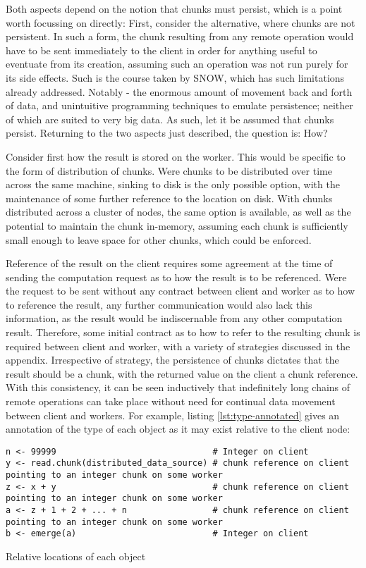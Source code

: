 Both aspects depend on the notion that chunks must persist, which is a
point worth focussing on directly: First, consider the alternative,
where chunks are not persistent. In such a form, the chunk resulting
from any remote operation would have to be sent immediately to the
client in order for anything useful to eventuate from its creation,
assuming such an operation was not run purely for its side effects. Such
is the course taken by SNOW, which has such limitations already
addressed. Notably - the enormous amount of movement back and forth of
data, and unintuitive programming techniques to emulate persistence;
neither of which are suited to very big data. As such, let it be assumed
that chunks persist. Returning to the two aspects just described, the
question is: How?

Consider first how the result is stored on the worker. This would be
specific to the form of distribution of chunks. Were chunks to be
distributed over time across the same machine, sinking to disk is the
only possible option, with the maintenance of some further reference to
the location on disk. With chunks distributed across a cluster of nodes,
the same option is available, as well as the potential to maintain the
chunk in-memory, assuming each chunk is sufficiently small enough to
leave space for other chunks, which could be enforced.

Reference of the result on the client requires some agreement at the
time of sending the computation request as to how the result is to be
referenced. Were the request to be sent without any contract between
client and worker as to how to reference the result, any further
communication would also lack this information, as the result would be
indiscernable from any other computation result. Therefore, some initial
contract as to how to refer to the resulting chunk is required between
client and worker, with a variety of strategies discussed in the
appendix. Irrespective of strategy, the persistence of chunks dictates
that the result should be a chunk, with the returned value on the client
a chunk reference. With this consistency, it can be seen inductively
that indefinitely long chains of remote operations can take place
without need for continual data movement between client and workers. For
example, listing \ref{lst:type-annotated} gives an annotation of the type of each
object as it may exist relative to the client node:

\begin{listing}
    \begin{verbatim}
n <- 99999                               # Integer on client
y <- read.chunk(distributed_data_source) # chunk reference on client pointing to an integer chunk on some worker
z <- x + y                               # chunk reference on client pointing to an integer chunk on some worker
a <- z + 1 + 2 + ... + n                 # chunk reference on client pointing to an integer chunk on some worker
b <- emerge(a)                           # Integer on client
    \end{verbatim}
    \caption{Relative locations of each object}
    \label{lst:type-annotated}
\end{listing}

